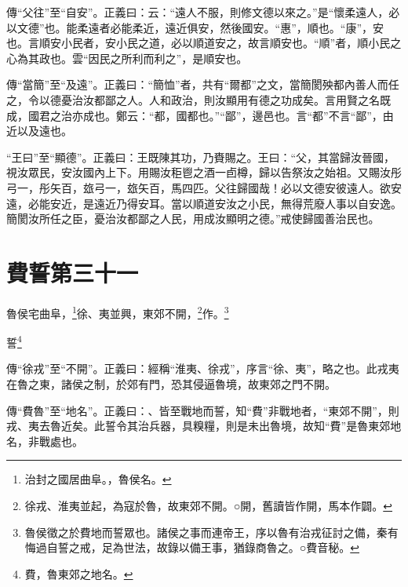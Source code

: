 {\noindent\zhuan{}\fzbyks 傳“父往”至“自安”。正義曰：云：“遠人不服，則修文德以來之。”是“懷柔遠人，必以文德”也。能柔遠者必能柔近，遠近俱安，然後國安。“惠”，順也。“康”，安也。言順安小民者，安小民之道，必以順道安之，故言順安也。“順”者，順小民之心為其政也。雲“因民之所利而利之”，是順安也。 \par}

{\noindent\zhuan{}\fzbyks 傳“當簡”至“及遠”。正義曰：“簡恤”者，共有“爾都”之文，當簡閡殃都內善人而任之，令以德憂治汝都鄙之人。人和政治，則汝顯用有德之功成矣。言用賢之名既成，國君之治亦成也。鄭云：“都，國都也。”“鄙”，邊邑也。言“都”不言“鄙”，由近以及遠也。 \par}

{\noindent\shu{}\fzkt “王曰”至“顯德”。正義曰：王既陳其功，乃賚賜之。王曰：“父，其當歸汝晉國，視汝眾民，安汝國內上下。用賜汝秬鬯之酒一卣樽，歸以告祭汝之始祖。又賜汝彤弓一，彤矢百，玈弓一，玈矢百，馬四匹。父往歸國哉！必以文德安彼遠人。欲安遠，必能安近，是遠近乃得安耳。當以順道安汝之小民，無得荒廢人事以自安逸。簡閡汝所任之臣，憂治汝都鄙之人民，用成汝顯明之德。”戒使歸國善治民也。 \par}

\section{費誓第三十一}


魯侯宅曲阜，\footnote{治封之國居曲阜。，魯侯名。}徐、夷並興，東郊不開，\footnote{徐戎、淮夷並起，為寇於魯，故東郊不開。○開，舊讀皆作開，馬本作闢。}作。\footnote{魯侯徵之於費地而誓眾也。諸侯之事而連帝王，序以魯有治戎征討之備，秦有悔過自誓之戒，足為世法，故錄以備王事，猶錄商魯之。○費音秘。}

誓\footnote{費，魯東郊之地名。}


{\noindent\zhuan{}\fzbyks 傳“徐戎”至“不開”。正義曰：經稱“淮夷、徐戎”，序言“徐、夷”，略之也。此戎夷在魯之東，諸侯之制，於郊有門，恐其侵逼魯境，故東郊之門不開。 \par}

{\noindent\zhuan{}\fzbyks 傳“費魯”至“地名”。正義曰：、皆至戰地而誓，知“費”非戰地者，“東郊不開”，則戎、夷去魯近矣。此誓令其治兵器，具糗糧，則是未出魯境，故知“費”是魯東郊地名，非戰處也。 \par}


